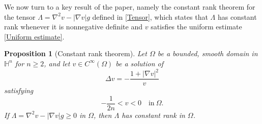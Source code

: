 \documentclass[11pt]{amsart}
\newtheorem{proposition}[theorem]{Proposition}
\numberwithin{theorem}{section}
\numberwithin{equation}{section}
\begin{document}
We now turn to a key result of the paper, namely the constant rank theorem for the tensor $\Lambda=\nabla^2v-|\nabla v|g$ defined in \eqref{Tensor}, which states that $\Lambda$ has constant rank whenever it is nonnegative definite and $v$ satisfies the uniform estimate \eqref{Uniform estimate}.
\begin{proposition}[Constant rank theorem]\label{Proposition-constant rank theorem}
Let $\Omega$ be a bounded, smooth domain in $\mathbb{H}^n$ for $n\geq 2$, and let $v\in C^\infty(\Omega)$ be a solution of
\begin{equation}\label{Equation-v}
\Delta v=-\frac{1+|\nabla v|^2}{v}
\end{equation}
satisfying
\begin{equation}\label{Assumption}
-\frac{1}{2n}<v<0\quad\mathrm{in}\ \Omega.
\end{equation}
If $\Lambda=\nabla^2v-|\nabla v|g\geq 0$ in $\Omega$, then $\Lambda$ has constant rank in $\Omega$.
\end{proposition}
\end{document}
